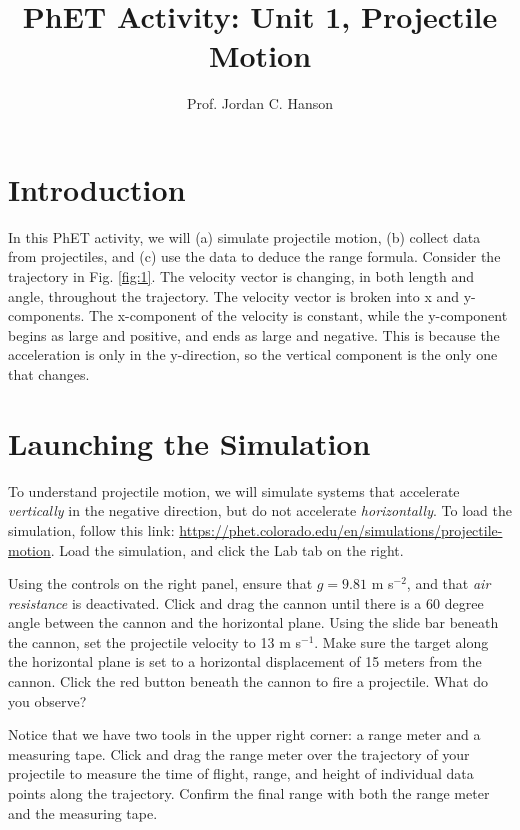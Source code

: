 \documentclass{article}
\begin{document}
\twocolumn

\title{PhET Activity: Unit 1, Projectile Motion}
\author{Prof. Jordan C. Hanson}

\maketitle

\section{Introduction}

In this PhET activity, we will (a) simulate projectile motion, (b) collect data from projectiles, and (c) use the data to deduce the range formula.  Consider the trajectory in Fig. \ref{fig:1}.  The velocity vector is changing, in both length and angle, throughout the trajectory.  The velocity vector is broken into x and y-components.  The x-component of the velocity is constant, while the y-component begins as large and positive, and ends as large and negative.  This is because the acceleration is only in the y-direction, so the vertical component is the only one that changes.

\section{Launching the Simulation}

To understand projectile motion, we will simulate systems that accelerate \textit{vertically} in the negative direction, but do not accelerate \textit{horizontally}.  To load the simulation, follow this link: \url{https://phet.colorado.edu/en/simulations/projectile-motion}.  Load the simulation, and click the Lab tab on the right.

Using the controls on the right panel, ensure that $g=9.81$ m s$^{-2}$, and that \textit{air resistance} is deactivated.  Click and drag the cannon until there is a 60 degree angle between the cannon and the horizontal plane.  Using the slide bar beneath the cannon, set the projectile velocity to 13 m s$^{-1}$.  Make sure the target along the horizontal plane is set to a horizontal displacement of 15 meters from the cannon.  Click the red button beneath the cannon to fire a projectile.  What do you observe?

Notice that we have two tools in the upper right corner: a range meter and a measuring tape.  Click and drag the range meter over the trajectory of your projectile to measure the time of flight, range, and height of individual data points along the trajectory.  Confirm the final range with both the range meter and the measuring tape.
\end{document}
